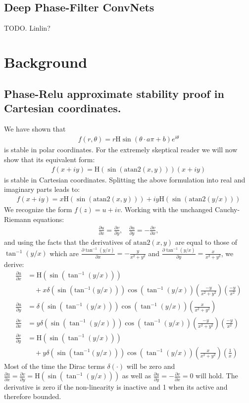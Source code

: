 \documentclass{article}
\begin{document}
\subsection{Deep Phase-Filter ConvNets}
TODO. Linlin?

\section{Background}
\subsection{Phase-Relu approximate stability proof in Cartesian coordinates.}
\label{sec:CarthesianPhaseRelu}
We have shown that 
\begin{align}
f(r,\theta) = r\text{H}\sin(\theta \cdot a \pi + b)e^{i\theta}
\end{align}
is stable in polar coordinates. For the extremely skeptical reader we will now show that its equivalent form:
\begin{align}
f(x + iy) = \text{H}(\sin(\text{atan2}(x,y)))(x + iy)
\end{align}
is stable in Cartesian coordinates.
Splitting the above formulation into real and imaginary parts leads to:
\begin{align}
f(x + iy) = x\text{H}(\sin(\text{atan2}(x,y))) + i y\text{H}(\sin(\text{atan2}(y/x)))
\end{align} 
We recognize the form $f(z) = u + iv$. Working with the unchanged Cauchy-Riemann equations:
\begin{align}
\frac{\partial u}{\partial x} = \frac{\partial v}{\partial y}, \;\;\; \frac{\partial u}{\partial y} = - \frac{\partial v}{\partial x},
\end{align}
and using the facts that the derivatives of $\text{atan2}(x,y)$ are equal to those of $\tan^{-1}(y/x)$ which are $\frac{\partial \tan^{-1}(y/x)}{\partial x} = -\frac{y}{x^2 + y^2}$ and $\frac{\partial \tan^{-1}(y/x)}{\partial y} = \frac{x}{x^2 + y^2}$, we derive:
\begin{align}
\frac{\partial u}{\partial x} &= \text{H}(\sin(\tan^{-1}(y/x))) \nonumber \\
&\quad +x\delta(\sin(\text{tan}^{-1}(y/x)))\cos(\tan^{-1}(y/x))(\frac{-y}{x^2 + y^2})(\frac{-y}{x^2}) \\
\frac{\partial u}{\partial y} &= \delta(\sin(\tan^{-1}( y/x)))\cos(\tan^{-1}(y/x))(\frac{x}{x^2 + y^2}) \\
\frac{\partial v}{\partial x} &= y\delta(\sin(\tan^{-1}( y/x)))\cos(\tan^{-1}(y/x))(\frac{-y}{x^2 + y^2})(\frac{-y}{x^2}) \\
\frac{\partial v}{\partial y} &= \text{H}(\sin(\tan^{-1}(y/x))) \nonumber \\
&\quad + y\delta(\sin(\text{tan}^{-1}(y/x)))\cos(\tan^{-1}(y/x))(\frac{x}{x^2 + y^2})(\frac{1}{x})
\end{align}
Most of the time the Dirac terms $\delta(\cdot)$ will be zero and $\frac{\partial u}{\partial x} = \frac{\partial v}{\partial y} = \text{H}(\sin(\tan^{-1}(y/x)))$ as well as $\frac{\partial u}{\partial y} = - \frac{\partial v}{\partial x} = 0$ will hold. The derivative is zero if the non-linearity is inactive and 1 when its active and therefore bounded.
\end{document}
